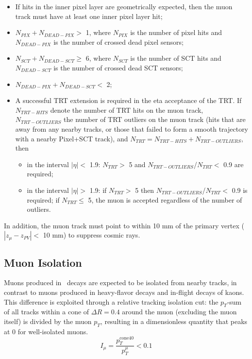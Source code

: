 \begin{itemize}
\item If hits in the inner pixel layer are geometrically expected, then the muon track must have at least 
one inner pixel layer hit;
\item $N_{PIX}+N_{DEAD-PIX} >$ 1, where $N_{PIX}$ is the number of pixel hits and $N_{DEAD-PIX}$
      is the number of crossed dead pixel sensors;
\item $N_{SCT}+N_{DEAD-SCT} \ge$ 6, where $N_{SCT}$ is the number of SCT hits and $N_{DEAD-SCT}$
      is the number of crossed dead SCT sensors;
\item $N_{DEAD-PIX}+N_{DEAD-SCT} <$ 2;
\item A successful TRT extension is required in the eta acceptance of the TRT. 
If $N_{TRT-HITS}$ denote the number of TRT hits on the muon track, $N_{TRT-OUTLIERS}$ the number of 
TRT outliers on the muon track (hits that are away from any nearby tracks, or those that failed to form a smooth trajectory with a nearby Pixel+SCT track), and $N_{TRT} = N_{TRT-HITS}+N_{TRT-OUTLIERS}$, then
\begin{itemize}
\item in the interval $|\eta| <$ 1.9: $N_{TRT} >$ 5 and $N_{TRT-OUTLIERS}$/$N_{TRT} <$ 0.9 are required;
\item in the interval $|\eta| >$ 1.9: if $N_{TRT} >$ 5 then $N_{TRT-OUTLIERS}$/$N_{TRT} <$ 0.9 is 
required; if $N_{TRT} \le$ 5, the muon is accepted regardless of the number of outliers.
\end{itemize}
\end{itemize}

In addition, the muon track must point to within 10 mm of the primary vertex ($|z_{\mu}-z_{PV}| <$ 10 mm) to suppress cosmic rays.

\subsection{Muon Isolation}
\label{subsec:MuonIsolation}
Muons produced in \Wmn\ decays are expected to be isolated from nearby tracks, in contrast to muons produced in heavy-flavor decays and in-flight decays of kaons. This difference is exploited through a relative tracking isolation cut: the $p_T$-sum of all tracks within a cone of $\Delta R = 0.4$ around the muon (excluding the muon itself) is divided by the muon $p_T$, resulting in a dimensionless quantity that peaks at 0 for well-isolated muons.
\begin{equation}
I_\mu = \frac{p_T^\mathrm{cone40}}{p_T^{\mu}} < 0.1
\end{equation}\label{eq:isolation}

